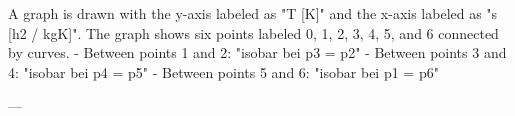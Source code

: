 A graph is drawn with the y-axis labeled as "T [K]" and the x-axis labeled as "s [h2 / kgK]". The graph shows six points labeled 0, 1, 2, 3, 4, 5, and 6 connected by curves.  
- Between points 1 and 2: "isobar bei p3 = p2"  
- Between points 3 and 4: "isobar bei p4 = p5"  
- Between points 5 and 6: "isobar bei p1 = p6"  

---
